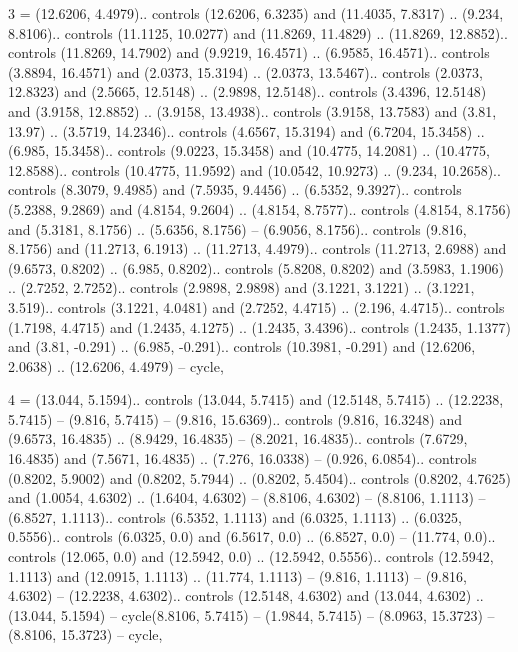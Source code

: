 3 = {(12.6206, 4.4979).. controls (12.6206, 6.3235) and (11.4035, 7.8317) .. (9.234, 8.8106).. controls (11.1125, 10.0277) and (11.8269, 11.4829) .. (11.8269, 12.8852).. controls (11.8269, 14.7902) and (9.9219, 16.4571) .. (6.9585, 16.4571).. controls (3.8894, 16.4571) and (2.0373, 15.3194) .. (2.0373, 13.5467).. controls (2.0373, 12.8323) and (2.5665, 12.5148) .. (2.9898, 12.5148).. controls (3.4396, 12.5148) and (3.9158, 12.8852) .. (3.9158, 13.4938).. controls (3.9158, 13.7583) and (3.81, 13.97) .. (3.5719, 14.2346).. controls (4.6567, 15.3194) and (6.7204, 15.3458) .. (6.985, 15.3458).. controls (9.0223, 15.3458) and (10.4775, 14.2081) .. (10.4775, 12.8588).. controls (10.4775, 11.9592) and (10.0542, 10.9273) .. (9.234, 10.2658).. controls (8.3079, 9.4985) and (7.5935, 9.4456) .. (6.5352, 9.3927).. controls (5.2388, 9.2869) and (4.8154, 9.2604) .. (4.8154, 8.7577).. controls (4.8154, 8.1756) and (5.3181, 8.1756) .. (5.6356, 8.1756) -- (6.9056, 8.1756).. controls (9.816, 8.1756) and (11.2713, 6.1913) .. (11.2713, 4.4979).. controls (11.2713, 2.6988) and (9.6573, 0.8202) .. (6.985, 0.8202).. controls (5.8208, 0.8202) and (3.5983, 1.1906) .. (2.7252, 2.7252).. controls (2.9898, 2.9898) and (3.1221, 3.1221) .. (3.1221, 3.519).. controls (3.1221, 4.0481) and (2.7252, 4.4715) .. (2.196, 4.4715).. controls (1.7198, 4.4715) and (1.2435, 4.1275) .. (1.2435, 3.4396).. controls (1.2435, 1.1377) and (3.81, -0.291) .. (6.985, -0.291).. controls (10.3981, -0.291) and (12.6206, 2.0638) .. (12.6206, 4.4979) -- cycle},

4 = {(13.044, 5.1594).. controls (13.044, 5.7415) and (12.5148, 5.7415) .. (12.2238, 5.7415) -- (9.816, 5.7415) -- (9.816, 15.6369).. controls (9.816, 16.3248) and (9.6573, 16.4835) .. (8.9429, 16.4835) -- (8.2021, 16.4835).. controls (7.6729, 16.4835) and (7.5671, 16.4835) .. (7.276, 16.0338) -- (0.926, 6.0854).. controls (0.8202, 5.9002) and (0.8202, 5.7944) .. (0.8202, 5.4504).. controls (0.8202, 4.7625) and (1.0054, 4.6302) .. (1.6404, 4.6302) -- (8.8106, 4.6302) -- (8.8106, 1.1113) -- (6.8527, 1.1113).. controls (6.5352, 1.1113) and (6.0325, 1.1113) .. (6.0325, 0.5556).. controls (6.0325, 0.0) and (6.5617, 0.0) .. (6.8527, 0.0) -- (11.774, 0.0).. controls (12.065, 0.0) and (12.5942, 0.0) .. (12.5942, 0.5556).. controls (12.5942, 1.1113) and (12.0915, 1.1113) .. (11.774, 1.1113) -- (9.816, 1.1113) -- (9.816, 4.6302) -- (12.2238, 4.6302).. controls (12.5148, 4.6302) and (13.044, 4.6302) .. (13.044, 5.1594) -- cycle(8.8106, 5.7415) -- (1.9844, 5.7415) -- (8.0963, 15.3723) -- (8.8106, 15.3723) -- cycle},

